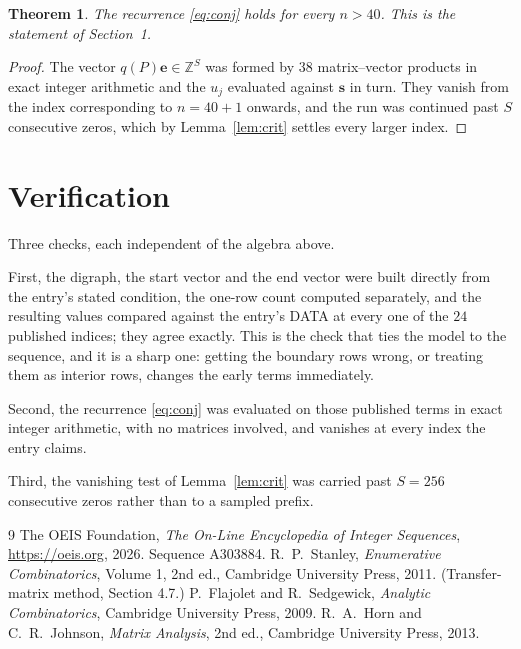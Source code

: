 \documentclass[11pt,a4paper]{article}
\theoremstyle{plain}
\newtheorem{theorem}{Theorem}
\theoremstyle{definition}
\begin{document}
\begin{theorem}
The recurrence \eqref{eq:conj} holds for every $n>40$. This is the statement of
Section~1.
\end{theorem}

\begin{proof}
The vector $q(P)\mathbf{e}\in\mathbb{Z}^{S}$ was formed by $38$ matrix--vector
products in exact integer arithmetic and the $u_j$ evaluated against $\mathbf{s}$ in turn.
They vanish from the index corresponding to $n=40+1$ onwards, and the run was continued
past $S$ consecutive zeros, which by Lemma~\ref{lem:crit} settles every larger index.
\end{proof}

\section{Verification}

Three checks, each independent of the algebra above.

First, the digraph, the start vector and the end vector were built directly from the
entry's stated condition, the one-row count computed separately, and the resulting values
compared against the entry's DATA at every one of the $24$ published indices; they
agree exactly. This is the check that ties the model to the sequence, and it is a sharp one:
getting the boundary rows wrong, or treating them as interior rows, changes the early terms
immediately.

Second, the recurrence \eqref{eq:conj} was evaluated on those published terms in exact
integer arithmetic, with no matrices involved, and vanishes at every index the entry claims.

Third, the vanishing test of Lemma~\ref{lem:crit} was carried past $S=256$ consecutive
zeros rather than to a sampled prefix.

\begin{thebibliography}{9}
 The OEIS Foundation, \emph{The On-Line Encyclopedia of Integer
Sequences}, \url{https://oeis.org}, 2026. Sequence A303884.
 R.~P.~Stanley, \emph{Enumerative Combinatorics}, Volume 1, 2nd ed.,
Cambridge University Press, 2011. (Transfer-matrix method, Section 4.7.)
 P.~Flajolet and R.~Sedgewick, \emph{Analytic Combinatorics}, Cambridge
University Press, 2009.
 R.~A.~Horn and C.~R.~Johnson, \emph{Matrix Analysis}, 2nd ed., Cambridge
University Press, 2013.
\end{thebibliography}
\end{document}
